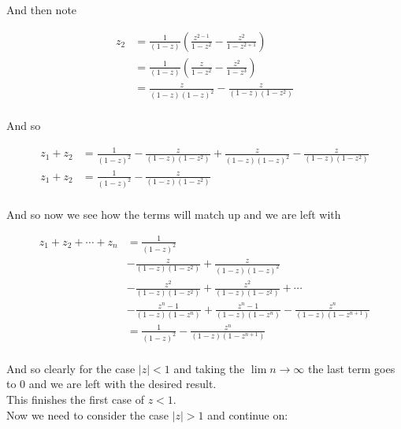\begin{enumerate}
	And then note

	\begin{align*}
		z_2 &= \frac{1}{(1 - z)} \left( \frac{z^{2 - 1}}{1 - z^{2}} - \frac{z^2}{1 - z^{2 + 1}} \right) \\
		&= \frac{1}{(1 - z)} \left( \frac{z}{1 - z^2} - \frac{z^2}{1 - z^{3}} \right) \\
		&= \frac{z}{(1 - z)(1 - z)^2} - \frac{z}{(1 - z)(1 - z^{2})} \\
	\end{align*}

	And so 

	\begin{align*}
		z_1 + z_2 &= \frac{1}{(1 - z)^2} - \frac{z}{(1 - z)(1 - z^{2})} + \frac{z}{(1 - z)(1 - z)^2} - \frac{z}{(1 - z)(1 - z^{2})} \\
		z_1 + z_2 &= \frac{1}{(1 - z)^2} - \frac{z}{(1 - z)(1 - z^{2})} \\
	\end{align*}

	And so now we see how the terms will match up and we are left with

	\begin{align*}
		z_1 + z_2 + \cdots + z_n &= \frac{1}{(1 - z)^2} \\
		&- \frac{z}{(1 - z)(1 - z^{2})} + \frac{z}{(1 - z)(1 - z)^2} \\
		&- \frac{z^2}{(1 - z)(1 - z^{2})} + \frac{z^2}{(1 - z)(1 - z^{2})} + \cdots \\
		&- \frac{z^n-1}{(1 - z)(1 - z^{n})} +\frac{z^n-1}{(1 - z)(1 - z^{n})} - \frac{z^n}{(1 - z)(1 - z^{n + 1})} \\
		&= \frac{1}{(1 - z)^2} - \frac{z^n}{(1 - z)(1 - z^{n + 1})} \\
	\end{align*}

	And so clearly for the case $|z| < 1$ and taking the $\lim n \to \infty$ the last term goes to $0$ and we are left 
	with the desired result. \\

	This finishes the first case of $z < 1$.\\

	Now we need to consider the case $|z| > 1$ and continue on:


\end{enumerate}
